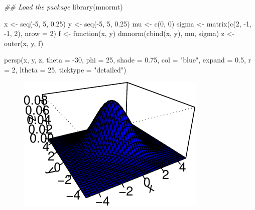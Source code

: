 \documentclass[
  letterpaper,
  DIV=11,
  numbers=noendperiod]{scrreprt}
\newenvironment{Shaded}{\begin{snugshade}}{\end{snugshade}}
\newcommand{\AttributeTok}[1]{\textcolor[rgb]{0.40,0.45,0.13}{#1}}
\newcommand{\ControlFlowTok}[1]{\textcolor[rgb]{0.00,0.23,0.31}{#1}}
\newcommand{\DecValTok}[1]{\textcolor[rgb]{0.68,0.00,0.00}{#1}}
\newcommand{\DocumentationTok}[1]{\textcolor[rgb]{0.37,0.37,0.37}{\textit{#1}}}
\newcommand{\FloatTok}[1]{\textcolor[rgb]{0.68,0.00,0.00}{#1}}
\newcommand{\FunctionTok}[1]{\textcolor[rgb]{0.28,0.35,0.67}{#1}}
\newcommand{\NormalTok}[1]{\textcolor[rgb]{0.00,0.23,0.31}{#1}}
\newcommand{\OtherTok}[1]{\textcolor[rgb]{0.00,0.23,0.31}{#1}}
\newcommand{\SpecialCharTok}[1]{\textcolor[rgb]{0.37,0.37,0.37}{#1}}
\newcommand{\StringTok}[1]{\textcolor[rgb]{0.13,0.47,0.30}{#1}}
\theoremstyle{definition}
\theoremstyle{plain}
\theoremstyle{plain}
\theoremstyle{remark}
\begin{document}
\begin{Shaded}
\begin{Highlighting}[]
\DocumentationTok{\#\# Load the package}
\FunctionTok{library}\NormalTok{(mnormt)}

\NormalTok{x     }\OtherTok{\textless{}{-}} \FunctionTok{seq}\NormalTok{(}\SpecialCharTok{{-}}\DecValTok{5}\NormalTok{, }\DecValTok{5}\NormalTok{, }\FloatTok{0.25}\NormalTok{) }
\NormalTok{y     }\OtherTok{\textless{}{-}} \FunctionTok{seq}\NormalTok{(}\SpecialCharTok{{-}}\DecValTok{5}\NormalTok{, }\DecValTok{5}\NormalTok{, }\FloatTok{0.25}\NormalTok{)}
\NormalTok{mu    }\OtherTok{\textless{}{-}} \FunctionTok{c}\NormalTok{(}\DecValTok{0}\NormalTok{, }\DecValTok{0}\NormalTok{)}
\NormalTok{sigma }\OtherTok{\textless{}{-}} \FunctionTok{matrix}\NormalTok{(}\FunctionTok{c}\NormalTok{(}\DecValTok{2}\NormalTok{, }\SpecialCharTok{{-}}\DecValTok{1}\NormalTok{, }\SpecialCharTok{{-}}\DecValTok{1}\NormalTok{, }\DecValTok{2}\NormalTok{), }\AttributeTok{nrow =} \DecValTok{2}\NormalTok{)}
\NormalTok{f     }\OtherTok{\textless{}{-}} \ControlFlowTok{function}\NormalTok{(x, y) }\FunctionTok{dmnorm}\NormalTok{(}\FunctionTok{cbind}\NormalTok{(x, y), mu, sigma)}
\NormalTok{z     }\OtherTok{\textless{}{-}} \FunctionTok{outer}\NormalTok{(x, y, f)}

\FunctionTok{persp}\NormalTok{(x, y, z, }\AttributeTok{theta =} \SpecialCharTok{{-}}\DecValTok{30}\NormalTok{, }\AttributeTok{phi =} \DecValTok{25}\NormalTok{, }
      \AttributeTok{shade =} \FloatTok{0.75}\NormalTok{, }\AttributeTok{col =} \StringTok{"blue"}\NormalTok{, }\AttributeTok{expand =} \FloatTok{0.5}\NormalTok{, }\AttributeTok{r =} \DecValTok{2}\NormalTok{, }
      \AttributeTok{ltheta =} \DecValTok{25}\NormalTok{, }\AttributeTok{ticktype =} \StringTok{"detailed"}\NormalTok{)}
\end{Highlighting}
\end{Shaded}

\begin{figure}[H]

{\centering \includegraphics{./02-Review-Prob_n_Stats_files/figure-pdf/unnamed-chunk-3-1.pdf}

}

\end{figure}
\end{document}

